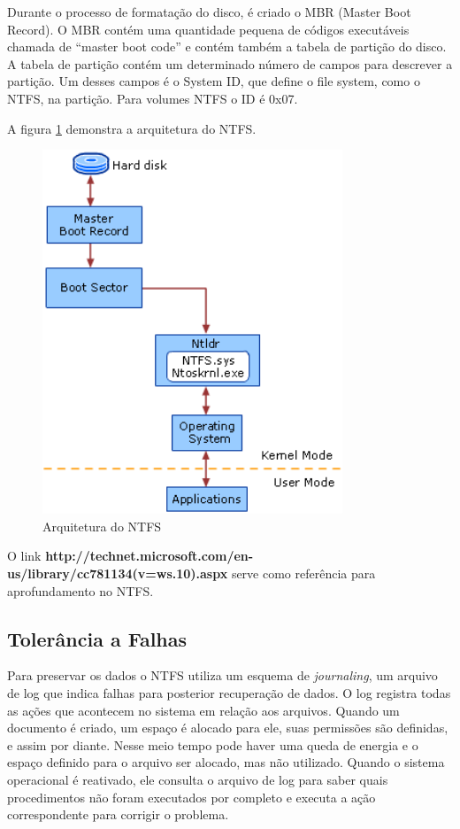 \begin{citacao}
  Durante o processo de formatação do disco, é criado o MBR (Master Boot Record). O MBR contém uma quantidade pequena de códigos executáveis chamada de ``master boot code'' e contém também a tabela de partição do disco. A tabela de partição contém um determinado número de campos para descrever a partição. Um desses campos é o System ID, que define o file system, como o NTFS, na partição. Para volumes NTFS o ID é 0x07. 
\end{citacao}

A figura \ref{fig:ntfs} demonstra a arquitetura do NTFS.

\begin{figure}[htb]
	\centering
	\includegraphics[width=0.8\textwidth]{sistemas_de_arquivos/fig/ntfs.png}
	\caption{Arquitetura do NTFS}
	\label{fig:ntfs}
\end{figure}

\newpage

O link \textbf{http://technet.microsoft.com/en-us/library/cc781134(v=ws.10).aspx} serve como referência para aprofundamento no NTFS.

\subsection{Tolerância a Falhas}

Para preservar os dados o NTFS utiliza um esquema de \emph{journaling}, um arquivo de log que indica falhas para posterior recuperação de dados. O log registra todas as ações que acontecem no sistema em relação aos arquivos. Quando um documento é criado, um espaço é alocado para ele, suas permissões são definidas, e assim por diante. Nesse meio tempo pode haver uma queda de energia e o espaço definido para o arquivo ser alocado, mas não utilizado. Quando o sistema operacional é reativado, ele consulta o arquivo de log para saber quais procedimentos não foram executados por completo e executa a ação correspondente para corrigir o problema.

